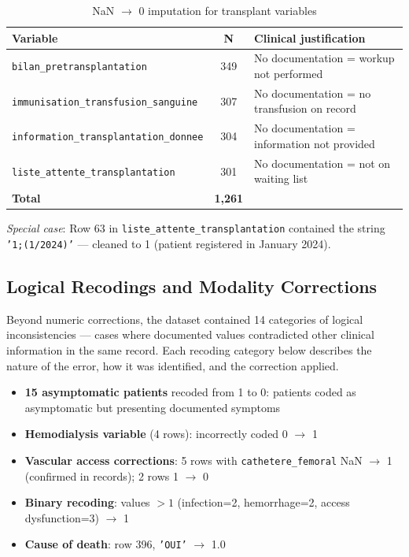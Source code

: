 \documentclass[12pt,a4paper,twoside]{report}
\begin{document}
\begin{table}[htbp]
\centering
\caption{NaN $\rightarrow$ 0 imputation for transplant variables}
\label{tab:transplant_imputation}
\small
\begin{tabularx}{\textwidth}{p{5.8cm}c>{\raggedright\arraybackslash}X}
\toprule
\textbf{Variable} & \textbf{N} & \textbf{Clinical justification} \\
\midrule
\texttt{bilan\_pretransplan\-tation} & 349 & No documentation = workup not performed \\
\texttt{immunisation\_transfu\-sion\_sanguine} & 307 & No documentation = no transfusion on record \\
\texttt{information\_transplan\-tation\_donnee} & 304 & No documentation = information not provided \\
\texttt{liste\_attente\_transplan\-tation} & 301 & No documentation = not on waiting list \\
\midrule
\textbf{Total} & \textbf{1,261} & \\
\bottomrule
\end{tabularx}
\end{table}

\textit{Special case}: Row 63 in \texttt{liste\_attente\_transplantation} contained the string \texttt{'1;(1/2024)'} — cleaned to 1 (patient registered in January 2024).

\subsection{Logical Recodings and Modality Corrections}

Beyond numeric corrections, the dataset contained 14 categories of logical inconsistencies — cases where documented values contradicted other clinical information in the same record. Each recoding category below describes the nature of the error, how it was identified, and the correction applied.

\begin{itemize}
  \item \textbf{15 asymptomatic patients} recoded from 1 to 0: patients coded as asymptomatic but presenting documented symptoms
  \item \textbf{Hemodialysis variable} (4 rows): incorrectly coded 0 $\rightarrow$ 1
  \item \textbf{Vascular access corrections}: 5 rows with \texttt{cathetere\_femoral} NaN $\rightarrow$ 1 (confirmed in records); 2 rows 1 $\rightarrow$ 0
  \item \textbf{Binary recoding}: values $>1$ (infection=2, hemorrhage=2, access dysfunction=3) $\rightarrow$ 1
  \item \textbf{Cause of death}: row 396, \texttt{'OUI'} $\rightarrow$ 1.0
\end{itemize}
\end{document}
